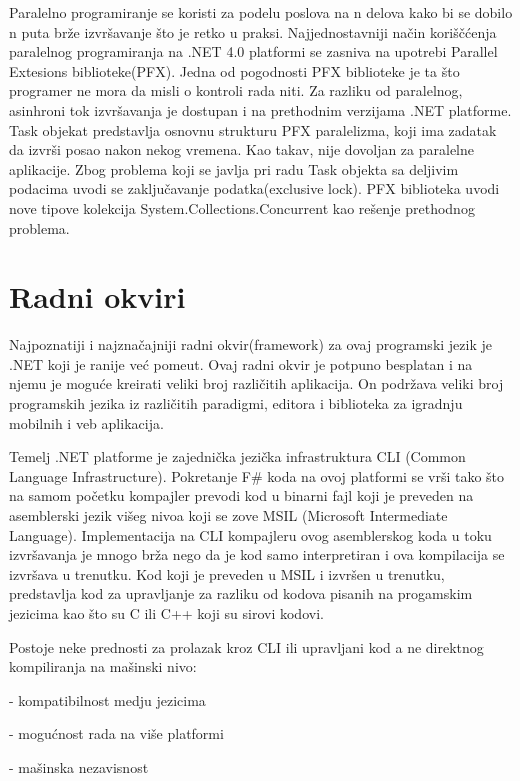 \documentclass[a4paper]{article}
\begin{document}
Paralelno programiranje se koristi za podelu poslova na n delova kako bi se dobilo n puta brže izvršavanje što je retko u praksi. Najjednostavniji način koriščćenja paralelnog programiranja na .NET 4.0 platformi se zasniva na upotrebi Parallel Extesions biblioteke(PFX). Jedna od pogodnosti PFX biblioteke je ta što programer ne mora da misli o kontroli rada niti. Za razliku od paralelnog, asinhroni tok izvršavanja je dostupan i na prethodnim verzijama .NET platforme. Task objekat predstavlja osnovnu strukturu PFX paralelizma, koji ima zadatak da izvrši posao nakon nekog vremena. Kao takav, nije dovoljan za paralelne aplikacije. Zbog problema koji se javlja pri radu Task objekta sa deljivim podacima uvodi se zaključavanje podatka(exclusive lock). PFX biblioteka uvodi nove tipove kolekcija System.Collections.Concurrent \cite{sysCC} kao rešenje prethodnog problema.  


\section{Radni okviri}

Najpoznatiji i najznačajniji radni okvir(framework) za ovaj programski jezik je .NET koji je ranije već pomeut. Ovaj radni okvir je potpuno besplatan i na njemu je moguće kreirati veliki broj različitih aplikacija. On podržava veliki broj programskih jezika iz različitih paradigmi, editora i biblioteka za igradnju mobilnih i veb aplikacija. 

Temelj .NET platforme je zajednička jezička infrastruktura CLI (Common Language Infrastructure). Pokretanje F\# koda na ovoj platformi se vrši tako što na samom početku kompajler prevodi kod u binarni fajl koji je preveden na asemblerski jezik višeg nivoa koji se zove MSIL (Microsoft Intermediate Language). Implementacija na CLI kompajleru ovog asemblerskog koda u toku izvršavanja je mnogo brža nego da je kod samo interpretiran i ova kompilacija se izvršava u trenutku\cite{progFs}.
Kod koji je preveden u MSIL i izvršen u trenutku, predstavlja kod za upravljanje za razliku od kodova pisanih na progamskim jezicima kao što su C ili C++ koji su sirovi kodovi.   

Postoje neke prednosti za prolazak kroz CLI ili upravljani kod a ne direktnog kompiliranja na mašinski nivo:	

	- kompatibilnost medju jezicima
	
	- mogućnost rada na više platformi
	
	- mašinska nezavisnost
\\
\end{document}
